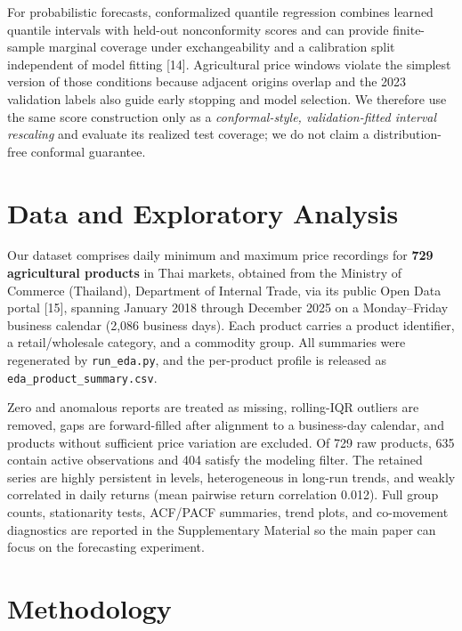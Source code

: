 \documentclass[review,3p,times]{elsarticle}
\begin{document}
For probabilistic forecasts, conformalized quantile regression combines learned quantile intervals with held-out nonconformity scores and can provide finite-sample marginal coverage under exchangeability and a calibration split independent of model fitting [14]. Agricultural price windows violate the simplest version of those conditions because adjacent origins overlap and the 2023 validation labels also guide early stopping and model selection. We therefore use the same score construction only as a \emph{conformal-style, validation-fitted interval rescaling} and evaluate its realized test coverage; we do not claim a distribution-free conformal guarantee.

\section{Data and Exploratory Analysis}

Our dataset comprises daily minimum and maximum price recordings for \textbf{729 agricultural products} in Thai markets, obtained from the Ministry of Commerce (Thailand), Department of Internal Trade, via its public Open Data portal [15], spanning January 2018 through December 2025 on a Monday--Friday business calendar (2,086 business days). Each product carries a product identifier, a retail/wholesale category, and a commodity group. All summaries were regenerated by \texttt{run\_eda.py}, and the per-product profile is released as \texttt{eda\_product\_summary.csv}.

Zero and anomalous reports are treated as missing, rolling-IQR outliers are removed, gaps are forward-filled after alignment to a business-day calendar, and products without sufficient price variation are excluded. Of 729 raw products, 635 contain active observations and 404 satisfy the modeling filter. The retained series are highly persistent in levels, heterogeneous in long-run trends, and weakly correlated in daily returns (mean pairwise return correlation 0.012). Full group counts, stationarity tests, ACF/PACF summaries, trend plots, and co-movement diagnostics are reported in the Supplementary Material so the main paper can focus on the forecasting experiment.

\setcounter{table}{2}

\section{Methodology}
\end{document}
